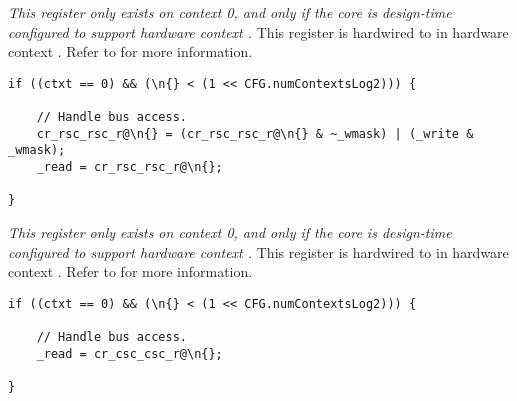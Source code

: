 
\emph{This register only exists on context 0, and only if the core is
design-time configured to support hardware context \n{}.} This register is 
hardwired to  in hardware context \n{}. Refer to  for more
information.

\implementation{}
\begin{lstlisting}
if ((ctxt == 0) && (\n{} < (1 << CFG.numContextsLog2))) {
    
    // Handle bus access.
    cr_rsc_rsc_r@\n{} = (cr_rsc_rsc_r@\n{} & ~_wmask) | (_write & _wmask);
    _read = cr_rsc_rsc_r@\n{};
    
}
\end{lstlisting}


\emph{This register only exists on context 0, and only if the core is
design-time configured to support hardware context \n{}.} This register is 
hardwired to  in hardware context \n{}. Refer to  for more
information.

\implementation{}
\begin{lstlisting}
if ((ctxt == 0) && (\n{} < (1 << CFG.numContextsLog2))) {
    
    // Handle bus access.
    _read = cr_csc_csc_r@\n{};
    
}
\end{lstlisting}

